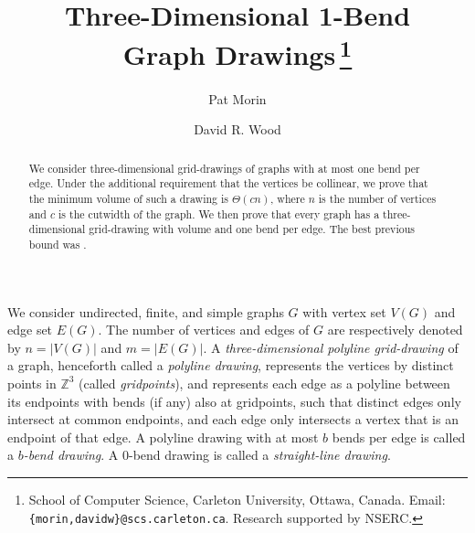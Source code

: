 \documentclass[10pt,a4paper]{article}
\begin{document}
\title{\textbf{Three-Dimensional 1-Bend\\ Graph Drawings}\,\footnote{School
of Computer Science, Carleton University, Ottawa, Canada. Email:
\texttt{\{morin,davidw\}@scs.carleton.ca}. Research supported by NSERC.}}

\author{Pat Morin \and  David R. Wood}

\maketitle

\begin{abstract} We consider three-dimensional  grid-drawings of graphs with at
most one bend per edge.  Under the additional requirement that the vertices be
collinear, we prove that the minimum volume of such a drawing is $\Theta(cn)$,
where $n$ is the number of vertices and $c$ is the cutwidth of the graph. We
then prove  that every graph has a  three-dimensional  grid-drawing with
 volume and one bend per edge. The best previous bound was
. \end{abstract}


We consider  undirected, finite, and simple graphs $G$ with  vertex set $V(G)$
and edge set $E(G)$. The number of vertices and edges of $G$ are respectively
denoted by $n=|V(G)|$ and $m=|E(G)|$. A \emph{three-dimensional polyline
grid-drawing} of a graph, henceforth called a \emph{polyline drawing},
represents the vertices by distinct points in $\mathbb{Z}^3$ (called
\emph{gridpoints}), and represents each edge as a polyline between its
endpoints with bends (if any) also at gridpoints, such that distinct edges only
intersect at common endpoints, and each edge only intersects a vertex that is
an endpoint of that edge. A polyline drawing with at most $b$ bends per edge is
called a \emph{$b$-bend drawing}. A $0$-bend drawing is called a
\emph{straight-line drawing}. 
\end{document}
